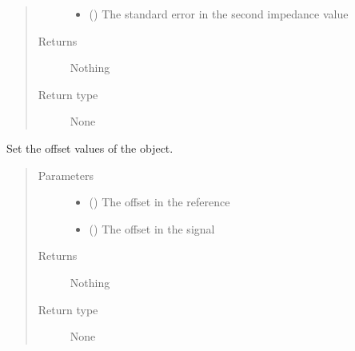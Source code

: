 \documentclass[letterpaper,10pt,english]{sphinxmanual}
\begin{document}
\begin{fulllineitems}
\begin{fulllineitems}
\begin{quote}
\begin{description}
\begin{itemize}
\item {} 
\sphinxAtStartPar
{} () \textendash{} The standard error in the second impedance value

\end{itemize}

\item[{Returns}] \leavevmode
\sphinxAtStartPar
Nothing

\item[{Return type}] \leavevmode
\sphinxAtStartPar
None

\end{description}\end{quote}

\end{fulllineitems}


\begin{fulllineitems}
\label{\detokenize{index:impedance.impedance.set_offsets}}
\sphinxAtStartPar
Set the offset values of the object.
\begin{quote}\begin{description}
\item[{Parameters}] \leavevmode\begin{itemize}
\item {} 
\sphinxAtStartPar
{} () \textendash{} The offset in the reference

\item {} 
\sphinxAtStartPar
{} () \textendash{} The offset in the signal

\end{itemize}

\item[{Returns}] \leavevmode
\sphinxAtStartPar
Nothing

\item[{Return type}] \leavevmode
\sphinxAtStartPar
None

\end{description}\end{quote}


\end{fulllineitems}
\end{fulllineitems}
\end{document}
